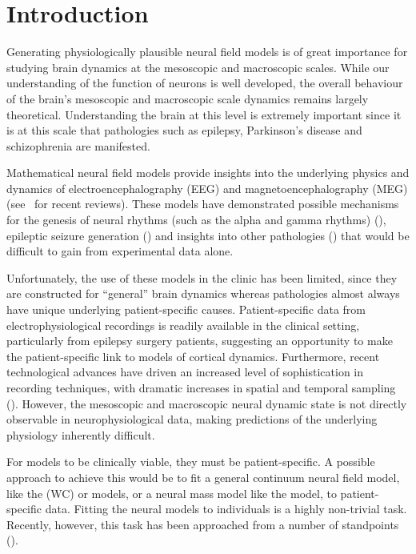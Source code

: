 \documentclass[5p,authoryear]{elsarticle}
\begin{document}
\section{Introduction}
Generating physiologically plausible neural field models is of great importance for studying brain dynamics at the mesoscopic and macroscopic scales. While our understanding of the function of neurons is well developed, the overall behaviour of the brain's mesoscopic and macroscopic scale dynamics remains largely theoretical. Understanding the brain at this level is extremely important since it is at this scale that pathologies such as epilepsy, Parkinson's disease and schizophrenia are manifested. 

Mathematical neural field models provide insights into the underlying physics and dynamics of electroencephalography (EEG) and magnetoencephalography (MEG) (see~\cite{Deco2008,David2003} for recent reviews). These models have demonstrated possible mechanisms for the genesis of neural rhythms (such as the alpha and gamma rhythms) (\cite{Liley1999,RENNIE2000}), epileptic seizure generation (\cite{DaSilva2003,Suffczynski2004,Wendling2005}) and insights into other pathologies (\cite{Moran2008,Schiff2009}) that would be difficult to gain from experimental data alone. 

Unfortunately, the use of these models in the clinic has been limited, since they are constructed for ``general'' brain dynamics whereas pathologies almost always have unique underlying patient-specific causes. Patient-specific data from electrophysiological recordings is readily available in the clinical setting, particularly from epilepsy surgery patients, suggesting an opportunity to make the patient-specific link to models of cortical dynamics. Furthermore, recent technological advances have driven an increased level of sophistication in recording techniques, with dramatic increases in spatial and temporal sampling (\cite{Brinkmann2009}). However, the mesoscopic and macroscopic neural dynamic state is not directly observable in neurophysiological data, making predictions of the underlying physiology inherently difficult.

For models to be clinically viable, they must be patient-specific. A possible approach to achieve this would be to fit a general continuum neural field model, like the \cite{Wilson1973} (WC) or \cite{Amari1977} models, or a neural mass model like the \cite{Jansen1995} model, to patient-specific data. Fitting the neural models to individuals is a highly non-trivial task. Recently, however, this task has been approached from a number of standpoints (\cite{Nunez2000,Jirsa2002,Robinson2004,Daunizeau2009}).
\end{document}
